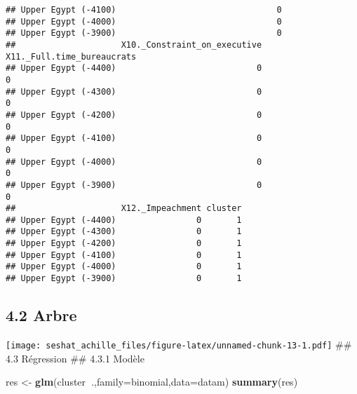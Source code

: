 \documentclass[
]{article}
\newenvironment{Shaded}{\begin{snugshade}}{\end{snugshade}}
\newcommand{\CommentTok}[1]{\textcolor[rgb]{0.56,0.35,0.01}{\textit{#1}}}
\newcommand{\DataTypeTok}[1]{\textcolor[rgb]{0.13,0.29,0.53}{#1}}
\newcommand{\DecValTok}[1]{\textcolor[rgb]{0.00,0.00,0.81}{#1}}
\newcommand{\KeywordTok}[1]{\textcolor[rgb]{0.13,0.29,0.53}{\textbf{#1}}}
\newcommand{\NormalTok}[1]{#1}
\newcommand{\OperatorTok}[1]{\textcolor[rgb]{0.81,0.36,0.00}{\textbf{#1}}}
\newcommand{\StringTok}[1]{\textcolor[rgb]{0.31,0.60,0.02}{#1}}
\begin{document}
\begin{verbatim}
## Upper Egypt (-4100)                                0
## Upper Egypt (-4000)                                0
## Upper Egypt (-3900)                                0
##                     X10._Constraint_on_executive X11._Full.time_bureaucrats
## Upper Egypt (-4400)                            0                          0
## Upper Egypt (-4300)                            0                          0
## Upper Egypt (-4200)                            0                          0
## Upper Egypt (-4100)                            0                          0
## Upper Egypt (-4000)                            0                          0
## Upper Egypt (-3900)                            0                          0
##                     X12._Impeachment cluster
## Upper Egypt (-4400)                0       1
## Upper Egypt (-4300)                0       1
## Upper Egypt (-4200)                0       1
## Upper Egypt (-4100)                0       1
## Upper Egypt (-4000)                0       1
## Upper Egypt (-3900)                0       1
\end{verbatim}

\hypertarget{arbre}{%
\subsection{4.2 Arbre}\label{arbre}}

\begin{Shaded}
\end{Shaded}

\texttt{[image: seshat\_achille\_files/figure-latex/unnamed-chunk-13-1.pdf]}
\#\# 4.3 Régression \#\# 4.3.1 Modèle

\begin{Shaded}
\begin{Highlighting}[]
\NormalTok{res <-}\StringTok{ }\KeywordTok{glm}\NormalTok{(cluster}\OperatorTok{~}\NormalTok{.,}\DataTypeTok{family=}\NormalTok{binomial,}\DataTypeTok{data=}\NormalTok{datam)}
\KeywordTok{summary}\NormalTok{(res)}
\end{Highlighting}
\end{Shaded}
\end{document}
